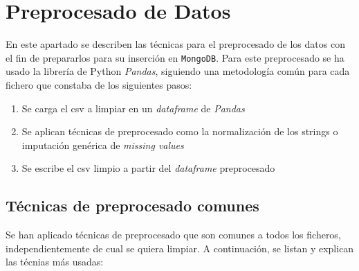 \documentclass[]{article}
\begin{document}
\newpage
\lstset{style=python}
\section{Preprocesado de Datos}
\label{sec:preprocesado}
En este apartado se describen las técnicas para el preprocesado de los datos con
el fin de prepararlos para su inserción en \texttt{MongoDB}. Para este preprocesado se ha usado la librería de Python \textit{Pandas}, siguiendo una metodología común para cada fichero que constaba de los siguientes pasos:

\begin{enumerate}
    \item Se carga el csv a limpiar en un \textit{dataframe} de \textit{Pandas}
    \item Se aplican técnicas de preprocesado como la normalización de los strings o imputación genérica de \textit{missing values}
    \item Se escribe el csv limpio a partir del \textit{dataframe} preprocesado
\end{enumerate}

\subsection{Técnicas de preprocesado comunes}
\label{subsec:preprocesadocomun}
Se han aplicado técnicas de preprocesado que son comunes a todos los ficheros, independientemente de cual se quiera limpiar. A continuación, se listan y explican las técnias más usadas:
\end{document}
